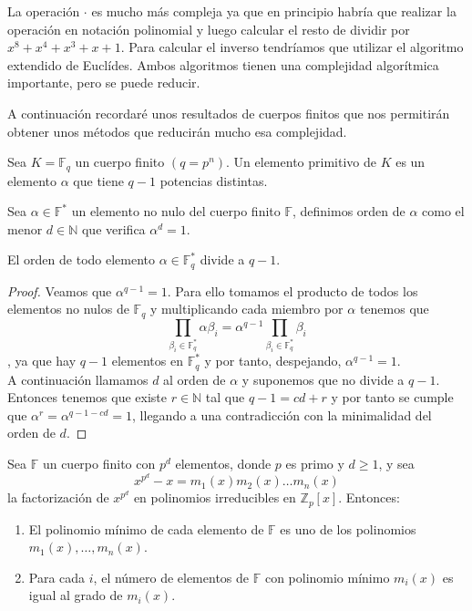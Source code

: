 La operación $\cdot$  es mucho más compleja ya que en principio habría que realizar la operación en notación polinomial y luego calcular el resto de dividir por $x^8+x^4+x^3+x+1$. Para calcular el inverso tendríamos que utilizar el algoritmo extendido de Euclídes. Ambos algoritmos tienen una complejidad algorítmica importante, pero se puede reducir.

A continuación recordaré unos resultados de cuerpos finitos que nos permitirán obtener unos métodos que reducirán mucho esa complejidad.\\
\begin{definicion}
	Sea $K=\mathbb{F}_q$ un cuerpo finito $(q=p^n)$. Un elemento primitivo de $K$ es un elemento $\alpha$ que tiene $q-1$ potencias distintas.
\end{definicion}

\begin{definicion}
		Sea $\alpha \in \mathbb{F}^*$ un elemento no nulo del cuerpo finito $\mathbb{F}$, definimos orden de $\alpha$ como el menor $d\in \mathbb{N}$ que verifica $\alpha^d=1$.
\end{definicion}

\begin{teorema}
	El orden de todo elemento $\alpha \in \mathbb{F}^*_q$ divide a $q-1$. 
\end{teorema}
\begin{proof}
		Veamos que $\alpha^{q-1}=1$. Para ello tomamos el producto de todos los elementos no nulos de $\mathbb{F}_q$ y multiplicando cada miembro por $\alpha$ tenemos que \[ \prod_{\beta_i \in \mathbb{F}^*_q}\alpha\beta_i=\alpha^{q-1}\prod_{\beta_i \in \mathbb{F}^*_q}\beta_i\],
		ya que hay $q-1$ elementos en $\mathbb{F}^*_q$ y por tanto, despejando, $\alpha^{q-1}=1$.\\
		A continuación llamamos $d$ al orden de $\alpha$ y suponemos que no divide a $q-1$. Entonces tenemos que existe $r\in\mathbb{N}$ tal que $q-1=cd+r$ y por tanto se cumple que $\alpha^r=\alpha^{q-1-cd}=1$, llegando a una contradicción con la minimalidad del orden de $d$.
\end{proof}

\begin{proposicion}
	Sea $\mathbb{F}$ un cuerpo finito con $p^d$ elementos, donde $p$ es primo y $d\geq 1$, y sea
	$$
		x^{p^d}-x=m_1(x)m_2(x)\dots m_n(x)
	$$
	la factorización  de $x^{p^d}$ en polinomios irreducibles en $\mathbb{Z}_p[x]$. Entonces:
	\begin{enumerate}
		\item El polinomio mínimo de cada elemento de $\mathbb{F}$ es uno de los polinomios $m_1(x),\dots,m_n(x)$.
		\item Para cada $i$, el número de elementos de $\mathbb{F}$ con polinomio mínimo $m_i(x)$ es igual al grado de $m_i(x)$.
	\end{enumerate}
\end{proposicion}

